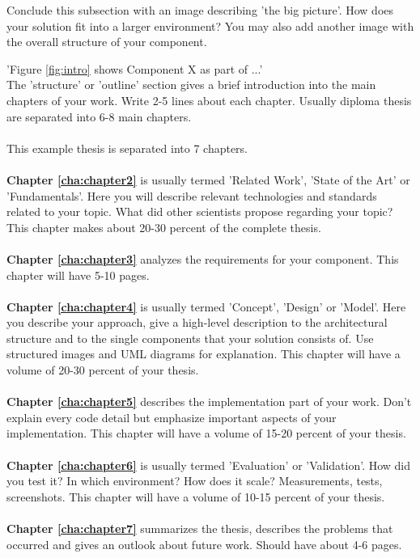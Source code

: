 Conclude this subsection with an image describing 'the big picture'. How does your solution fit into a larger environment? You may also add another image with the overall structure of your component.

'Figure \ref{fig:intro} shows Component X as part of ...' 
\\


 The 'structure' or 'outline' section gives a brief introduction into the main chapters of your work. Write 2-5 lines about each chapter. Usually diploma thesis are separated into 6-8 main chapters. 
 \\
 \\
 \noindent This example thesis is separated into 7 chapters.
 \\
 \\
 

 
 \textbf{Chapter \ref{cha:chapter2}} is usually termed 'Related Work', 'State of the Art' or 'Fundamentals'. Here you will describe relevant technologies and standards related to your topic. What did other scientists propose regarding your topic? This chapter makes about 20-30 percent of the complete thesis.
 \\
 \\
 \textbf{Chapter \ref{cha:chapter3}} analyzes the requirements for your component. This chapter will have 5-10 pages.
 \\
 \\
 \textbf{Chapter \ref{cha:chapter4}} is usually termed 'Concept', 'Design' or 'Model'. Here you describe your approach, give a high-level description to the architectural structure and to the single components that your solution consists of. Use structured images and UML diagrams for explanation. This chapter will have a volume of 20-30 percent of your thesis.
 \\
 \\
 \textbf{Chapter \ref{cha:chapter5}} describes the implementation part of your work. Don't explain every code detail but emphasize important aspects of your implementation. This chapter will have a volume of 15-20 percent of your thesis.
 \\
 \\
 \textbf{Chapter \ref{cha:chapter6}} is usually termed 'Evaluation' or 'Validation'. How did you test it? In which environment? How does it scale? Measurements, tests, screenshots. This chapter will have a volume of 10-15 percent of your thesis.
 \\
 \\
 \textbf{Chapter \ref{cha:chapter7}} summarizes the thesis, describes the problems that occurred and gives an outlook about future work. Should have about 4-6 pages.